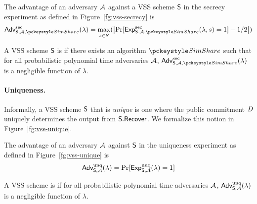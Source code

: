The advantage of an adversary $\mathcal{A}$ against a VSS scheme $\mathsf{S}$ in the secrecy experiment as defined in Figure~\ref{fg:vss-secrecy} is
\[
  \advant{sec}{\vess,\adv, \simshare}(\lambda) = \max_{\secret \in \secretspace}(\bigabs{\Pr[\SecrecyExp_{\vess,\adv,\simshare}(\lambda, \secret) = 1 ]  - 1/2 } )
\]

\begin{definition} \label{defn:vss-secrecy}
A VSS scheme $\mathsf{S}$ is  if
there exists an algorithm $\simshare$ such that
for all probabilistic polynomial time adversaries $\mathcal{A}$,
$\advant{sec}{\vess,\adv,\simshare}(\lambda)$  is a negligible function of $\lambda$.
\end{definition}

\paragraph{Uniqueness.}
Informally, a VSS scheme $\mathsf{S}$ that is \emph{unique} is one where the public commitment $\textit{D}$ uniquely determines the output from $\mathsf{S}.\mathsf{Recover}$.
We formalize this notion in Figure~\ref{fg:vss-unique}.

The advantage of an adversary $\mathcal{A}$ against $\mathsf{S}$ in the uniqueness experiment as defined in Figure~\ref{fg:vss-unique} is
\[
  \textsf{\upshape Adv}^{\textrm{\upshape unq}}_{\mathsf{S},\mathcal{A}}(\lambda) = \Pr[\textsf{Exp}^{\textrm{unq}}_{\mathsf{S},\mathcal{A}}(\lambda) = 1 ]
\]

\begin{definition}
A VSS scheme is  if for all probabilistic polynomial time adversaries $\mathcal{A}$,
$\textsf{\upshape Adv}^{\textrm{\upshape unq}}_{\mathsf{S},\mathcal{A}}(\lambda)$  is a negligible function of $\lambda$.
\end{definition}
